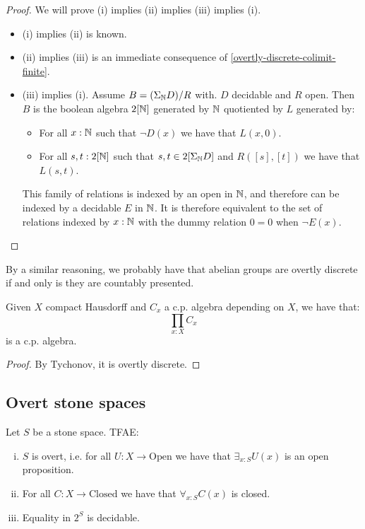 \begin{proof}
We will prove (i) implies (ii) implies (iii) implies (i).
\begin{itemize}
\item (i) implies (ii) is known.
\item (ii) implies (iii) is an immediate consequence of \cref{overtly-discrete-colimit-finite}.
\item (iii) implies (i). Assume $B = (\Sigma_{\mathbb{N}} D)/R$ with. $D$ decidable and $R$ open. Then $B$ is the boolean algebra $2[\mathbb{N}]$ generated by $\mathbb{N}$ quotiented by $L$ generated by:
\begin{itemize} 
\item For all $x:\mathbb{N}$ such that $\neg D(x)$ we have that $L(x,0)$.
\item For all $s,t:2[\mathbb{N}]$ such that $s,t\in 2[\Sigma_{\mathbb{N}} D]$ and $R([s],[t])$ we have that $L(s,t)$.
\end{itemize}
This family of relations is indexed by an open in $\mathbb{N}$, and therefore can be indexed by a decidable $E$ in $\mathbb{N}$. It is therefore equivalent to the set of relations indexed by $x:\mathbb{N}$ with the dummy relation $0=0$ when $\neg E(x)$.
\end{itemize}
\end{proof}

\begin{remark}
By a similar reasoning, we probably have that abelian groups are overtly discrete if and only is they are countably presented.
\end{remark}

\begin{corollary}
Given $X$ compact Hausdorff and $C_x$ a c.p. algebra depending on $X$, we have that:
\[\prod_{x:X}C_x\]
is a c.p. algebra.
\end{corollary}

\begin{proof}
By Tychonov, it is overtly discrete. 
\end{proof}


\subsection{Overt stone spaces}

\begin{proposition}
Let $S$ be a stone space. TFAE:
\begin{enumerate}[(i)]
\item $S$ is overt, i.e. for all $U:X\to \mathrm{Open}$ we have that $\exists_{x:S} U(x)$ is an open proposition.
\item For all $C:X\to \mathrm{Closed}$ we have that $\forall_{x:S} C(x)$ is closed.
\item Equality in $2^S$ is decidable.
\end{enumerate}
\end{proposition}

